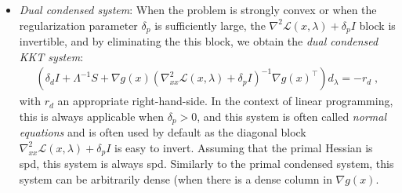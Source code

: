 \documentclass{article}
\begin{document}
\begin{itemize}[leftmargin=*,itemsep=0pt,parsep=0pt,partopsep=0pt]
\item \textit{Dual condensed system}:
When the problem is strongly convex or when the regularization parameter $\delta_p$ is sufficiently large, the $\nabla^2 \mathcal{L}(x,\lambda) + \delta_p I$ block is invertible, and by eliminating the this block, we obtain the \emph{dual condensed KKT system}:
\begin{align}\label{eqn:kkt_dual}
  \left(\delta_d I + \Lambda^{-1}S + \nabla g(x)\left(\nabla_{x x}^2 \mathcal{L}(x,\lambda) + \delta_p I\right)^{-1} \nabla g(x)^\top\right)
  d_\lambda = - r_d \; ,
\end{align}
with $r_d$ an appropriate right-hand-side.
In the context of linear programming, this is always applicable when $\delta_p>0$, and this system is often called \emph{normal equations} and is often used by default as the diagonal block $\nabla^2_{x x} \mathcal{L}(x, \lambda) + \delta_p I$ is easy to invert.
Assuming that the primal Hessian is \gls*{spd}, this system is always \gls*{spd}.
Similarly to the primal condensed system, this system can be arbitrarily dense (when there is a dense column in $\nabla g(x)$.
\end{itemize}
\end{document}
